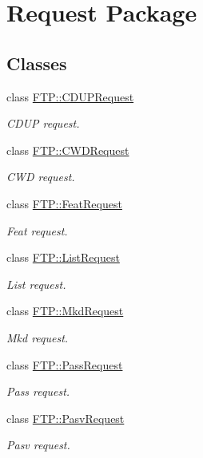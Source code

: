 \hypertarget{group__request}{}\section{Request Package}
\label{group__request}
\subsection*{Classes}
\begin{DoxyCompactItemize}
\item 
class \hyperlink{classFTP_1_1CDUPRequest}{F\+T\+P\+::\+C\+D\+U\+P\+Request}
\begin{DoxyCompactList}\small\item\em C\+D\+U\+P request. \end{DoxyCompactList}\item 
class \hyperlink{classFTP_1_1CWDRequest}{F\+T\+P\+::\+C\+W\+D\+Request}
\begin{DoxyCompactList}\small\item\em C\+W\+D request. \end{DoxyCompactList}\item 
class \hyperlink{classFTP_1_1FeatRequest}{F\+T\+P\+::\+Feat\+Request}
\begin{DoxyCompactList}\small\item\em Feat request. \end{DoxyCompactList}\item 
class \hyperlink{classFTP_1_1ListRequest}{F\+T\+P\+::\+List\+Request}
\begin{DoxyCompactList}\small\item\em List request. \end{DoxyCompactList}\item 
class \hyperlink{classFTP_1_1MkdRequest}{F\+T\+P\+::\+Mkd\+Request}
\begin{DoxyCompactList}\small\item\em Mkd request. \end{DoxyCompactList}\item 
class \hyperlink{classFTP_1_1PassRequest}{F\+T\+P\+::\+Pass\+Request}
\begin{DoxyCompactList}\small\item\em Pass request. \end{DoxyCompactList}\item 
class \hyperlink{classFTP_1_1PasvRequest}{F\+T\+P\+::\+Pasv\+Request}
\begin{DoxyCompactList}\small\item\em Pasv request. \end{DoxyCompactList}\item 

\end{DoxyCompactItemize}
